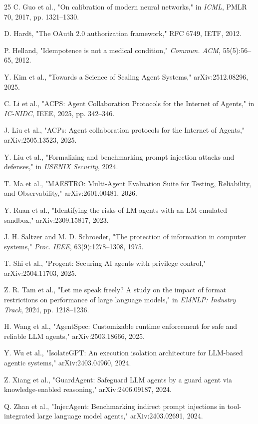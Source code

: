 \documentclass[runningheads,a4paper]{llncs}
\begin{document}
\begin{thebibliography}{25}
 C. Guo et al., "On calibration of modern neural networks," in \emph{ICML}, PMLR 70, 2017, pp. 1321--1330.

 D. Hardt, "The OAuth 2.0 authorization framework," RFC 6749, IETF, 2012.

 P. Helland, "Idempotence is not a medical condition," \emph{Commun. ACM}, 55(5):56--65, 2012.

 Y. Kim et al., "Towards a Science of Scaling Agent Systems," arXiv:2512.08296, 2025.

 C. Li et al., "ACPS: Agent Collaboration Protocols for the Internet of Agents," in \emph{IC-NIDC}, IEEE, 2025, pp. 342--346.

 J. Liu et al., "ACPs: Agent collaboration protocols for the Internet of Agents," arXiv:2505.13523, 2025.

 Y. Liu et al., "Formalizing and benchmarking prompt injection attacks and defenses," in \emph{USENIX Security}, 2024.

 T. Ma et al., "MAESTRO: Multi-Agent Evaluation Suite for Testing, Reliability, and Observability," arXiv:2601.00481, 2026.

 Y. Ruan et al., "Identifying the risks of LM agents with an LM-emulated sandbox," arXiv:2309.15817, 2023.

 J. H. Saltzer and M. D. Schroeder, "The protection of information in computer systems," \emph{Proc. IEEE}, 63(9):1278--1308, 1975.

 T. Shi et al., "Progent: Securing AI agents with privilege control," arXiv:2504.11703, 2025.

 Z. R. Tam et al., "Let me speak freely? A study on the impact of format restrictions on performance of large language models," in \emph{EMNLP: Industry Track}, 2024, pp. 1218--1236.

 H. Wang et al., "AgentSpec: Customizable runtime enforcement for safe and reliable LLM agents," arXiv:2503.18666, 2025.

 Y. Wu et al., "IsolateGPT: An execution isolation architecture for LLM-based agentic systems," arXiv:2403.04960, 2024.

 Z. Xiang et al., "GuardAgent: Safeguard LLM agents by a guard agent via knowledge-enabled reasoning," arXiv:2406.09187, 2024.

 Q. Zhan et al., "InjecAgent: Benchmarking indirect prompt injections in tool-integrated large language model agents," arXiv:2403.02691, 2024.

\end{thebibliography}
\end{document}
